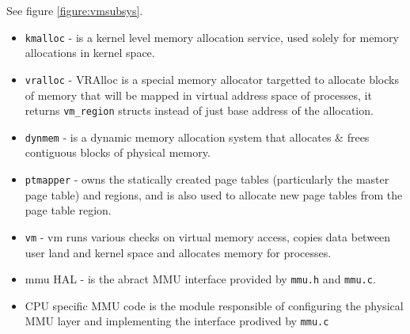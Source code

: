 See figure \ref{figure:vmsubsys}.

\begin{itemize}
  \item \verb+kmalloc+  - is a kernel level memory allocation service, used
                        solely for memory allocations in kernel space.
  \item \verb+vralloc+  - VRAlloc is a special memory allocator targetted to
                        allocate blocks of memory that will be mapped in virtual
                        address space of processes, it returns \verb+vm_region+
                        structs instead of just base address of the allocation.
  \item \verb+dynmem+   - is a dynamic memory allocation system that allocates
                        \& frees contiguous blocks of physical memory.
  \item \verb+ptmapper+ - owns the statically created page tables (particularly
                        the master page table) and regions, and is also used to
                        allocate new page tables from the page table region.
  \item \verb+vm+       - vm runs various checks on virtual memory access,
                        copies data between user land and kernel space and
                        allocates memory for processes.
  \item mmu HAL -       is the abract MMU interface provided by \verb+mmu.h+
                        and \verb+mmu.c+.
  \item CPU specific MMU code is the module responsible of configuring the
        physical MMU layer and implementing the interface prodived by
        \verb+mmu.c+
\end{itemize}


